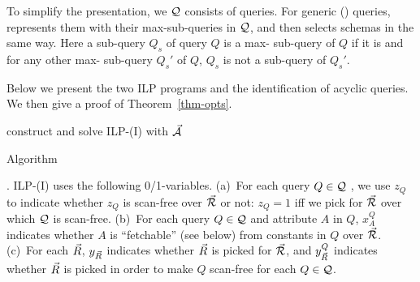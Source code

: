 \vspace{0.36ex}
To simplify the presentation, %
we 
$\mathcal Q$ consists of \SPC queries. For generic \RA (\SQL)
queries,  represents them with their max-\SPC sub-queries
in $\mathcal Q$, %
and then selects schemas in the same way.
Here a sub-query $Q_{s}$ of \RA query $Q$ is a max-\SPC
sub-query of $Q$ if it is  and for any other max-\SPC
sub-query $Q_{s}'$ of $Q$, $Q_{s}$ is not a sub-query of $Q_{s}'$.


\vspace{0.8ex}
Below we present the two ILP programs and the identification
of acyclic queries. We then give a proof
of Theorem~\ref{thm-opts}.

\begin{myfloat}[t]
\vspace{1.2ex}
\begin{minipage}{0.50\textwidth}
  \removelatexerror
{\scriptsize
\setlength{\floatsep}{0cm} %
\setlength{\textfloatsep}{-2cm}%
\IncMargin{1em}
\vspace{-0.7ex}
\begin{algorithm}[H]
\Indentp{-2ex}
{}
\Indentp{1em}
\BlankLine
construct and solve ILP-(I) with
$\vec{{\mathcal A}}$\label{opts-l1}
\caption{Algorithm \opts\label{alg-opts}} 
\end{algorithm}
\DecMargin{1em}
}
\end{minipage}
\vspace{-2.4ex}
\end{myfloat}

. 
ILP-(I) uses the following 0/1-variables. 
(a)~For each query $Q\in \mathcal Q$ , we use $z_{Q}$ to indicate whether
$z_{Q}$ is scan-free over $\vec{{\mathcal R}}$ or not:
$z_{Q} = 1$ iff we pick \bss for $\vec{{\mathcal R}}$ over which $\mathcal Q$ is scan-free.
(b)~For each query $Q\in \mathcal Q$ and attribute $A$ in $Q$, 
$x_{A}^{Q}$ indicates whether $A$ is ``fetchable'' (see below)
from constants
in $Q$ over $\vec{{\mathcal R}}$. 
(c)~For each \bs $\vec{R}$, $y_{\vec{R}}$ indicates
whether $\vec{R}$ is picked for $\vec{{\mathcal R}}$, and $y^{Q}_{\vec{R}}$ 
indicates whether $\vec{R}$ is picked in order to make $Q$ scan-free
for each $Q\in \mathcal Q$.

